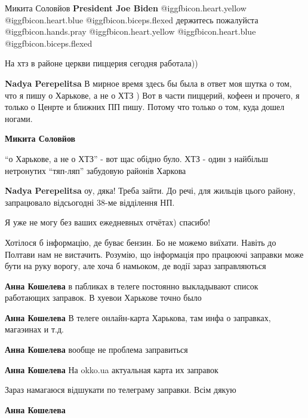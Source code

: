 \begin{itemize}
Микита Соловйов \textbf{President Joe Biden}  @igg{fbicon.heart.yellow}  @igg{fbicon.heart.blue}  @igg{fbicon.biceps.flexed}  держитесь пожалуйста  @igg{fbicon.hands.pray}  @igg{fbicon.heart.yellow}  @igg{fbicon.heart.blue}  @igg{fbicon.biceps.flexed} 

На хтз в районе церкви пиццерия сегодня работала))

\begin{itemize} %
\textbf{Nadya Perepelitsa} В мирное время здесь бы была в ответ моя шутка о том, что я пишу о Харькове, а не о ХТЗ )
Вот в части пиццерий, кофеен и прочего, я только о Ценрте и ближних ПП пишу. Потому что только о том, куда дошел ногами.

\textbf{Микита Соловйов} 

\enquote{о Харькове, а не о ХТЗ} - вот щас обідно було. ХТЗ - один з найбільш нетронутих \enquote{тяп-ляп} забудовую районів Харкова

\textbf{Nadya Perepelitsa} оу, дяка! Треба зайти. До речі, для жильців цього району, запрацювало відсьогодні 38-ме відділення НП.
\end{itemize} %

Я уже не могу без ваших ежедневных отчётах) спасибо!


Хотілося б інформацію, де буває бензин. Бо не можемо виїхати. Навіть до Полтави
нам не вистачить. Розумію, що інформація про працюючі заправки може бути на
руку ворогу, але хоча б намьоком, де водії зараз заправляються

\begin{itemize} %
\textbf{Анна Кошелева} в пабликах в телеге постоянно выкладывают список работающих заправок. В хуевои Харькове точно было

\textbf{Анна Кошелева} В телеге онлайн-карта Харькова, там инфа о заправках, магаэинах и т.д.

\textbf{Анна Кошелева} вообще не проблема заправиться

\textbf{Анна Кошелева} На okko.ua актуальная карта их заправок

Зараз намагаюся відшукати по телеграму заправки. Всім дякую

\textbf{Анна Кошелева} 


\end{itemize}
\end{itemize}
